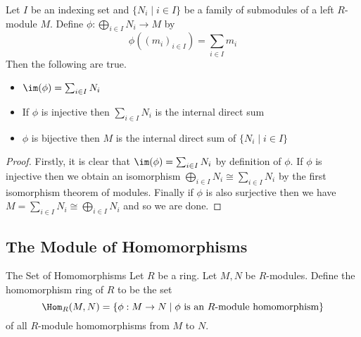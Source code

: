 \documentclass[a4paper]{article}
\begin{document}
\begin{lmm}{}{} Let $I$ be an indexing set and $\{N_i\;|\;i\in I\}$ be a family of submodules of a left $R$-module $M$. Define $\phi:\bigoplus_{i\in I}N_i\to M$ by $$\phi\left((m_i)_{i\in I}\right)=\sum_{i\in I}m_i$$ Then the following are true. 
\begin{itemize}
\item $\im(\phi)=\sum_{i\in I}N_i$
\item If $\phi$ is injective then $\sum_{i\in I}N_i$ is the internal direct sum
\item $\phi$ is bijective then $M$ is the internal direct sum of $\{N_i\;|\;i\in I\}$
\end{itemize} \tcbline
\begin{proof}
Firstly, it is clear that $\im(\phi)=\sum_{i\in I}N_i$ by definition of $\phi$. If $\phi$ is injective then we obtain an isomorphism $\bigoplus_{i\in I}N_i\cong\sum_{i\in I}N_i$ by the first isomorphism theorem of modules. Finally if $\phi$ is also surjective then we have $M=\sum_{i\in I}N_i\cong\bigoplus_{i\in I}N_i$ and so we are done. 
\end{proof}
\end{lmm}

\subsection{The Module of Homomorphisms}
\begin{defn}{The Set of Homomorphisms}{} Let $R$ be a ring. Let $M,N$ be $R$-modules. Define the homomorphism ring of $R$ to be the set $$\Hom_R(M,N)=\{\phi:M\to N\;|\;\phi\text{ is an }R\text{-module homomorphism}\}$$ of all $R$-module homomorphisms from $M$ to $N$.
\end{defn}
\end{document}
